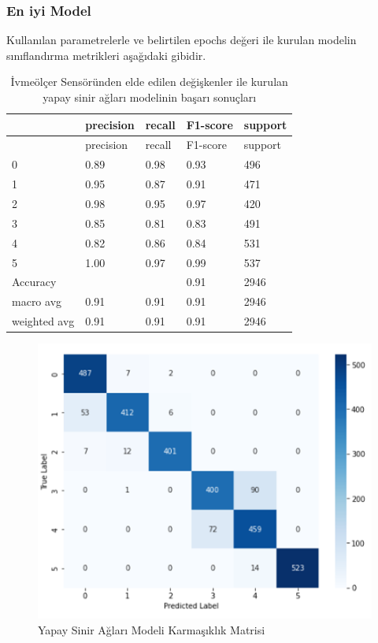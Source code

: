 \documentclass[12pt,twoside]{deuthesis}
\begin{document}
\hypertarget{en-iyi-model-9}{%
\subsubsection{En iyi Model}\label{en-iyi-model-9}}

Kullanılan parametrelerle ve belirtilen epochs değeri ile kurulan modelin sınıflandırma metrikleri aşağıdaki gibidir.
\begin{longtable}[]{@{}lllll@{}}
\caption{\label{tab:iysa} İvmeölçer Sensöründen elde edilen değişkenler ile kurulan yapay sinir ağları modelinin başarı sonuçları}\tabularnewline
\toprule()
& precision & recall & F1-score & support \\
\midrule()
\endfirsthead
\toprule()
& precision & recall & F1-score & support \\
\midrule()
\endhead
0 & 0.89 & 0.98 & 0.93 & 496 \\
1 & 0.95 & 0.87 & 0.91 & 471 \\
2 & 0.98 & 0.95 & 0.97 & 420 \\
3 & 0.85 & 0.81 & 0.83 & 491 \\
4 & 0.82 & 0.86 & 0.84 & 531 \\
5 & 1.00 & 0.97 & 0.99 & 537 \\
Accuracy & & & 0.91 & 2946 \\
macro avg & 0.91 & 0.91 & 0.91 & 2946 \\
weighted avg & 0.91 & 0.91 & 0.91 & 2946 \\
\bottomrule()
\end{longtable}
\begin{figure}

{\centering \includegraphics[width=0.9\linewidth,height=0.35\textheight]{figure/iysa_confmat} 

}

\caption{Yapay Sinir Ağları Modeli Karmaşıklık Matrisi}\label{fig:iysaconfmat}
\end{figure}
\end{document}

